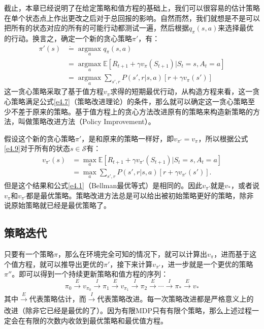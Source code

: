 \documentclass{ctexart}
\begin{document}
            截止，本章已经说明了在给定策略和值方程的基础上，我们可以很容易的估计策略在单个状态点上作出更改之后对于总回报的影响。自然而然，我们就想是不是可以把所有的状态对应的所有的可能行动都测试一遍，然后根据$q_{\pi}(s,a)$来选择最优的行动。换言之，确定一个新的贪心策略$\pi '$，有：
            \begin{equation}
                \begin{split}
                    \pi '(s) &\dot{=} \operatorname*{argmax}\limits_a q_{\pi}(s,a) \\
                             &= \operatorname*{argmax}\limits_{a} \mathbb{E}[R_{t+1} + \gamma v_{\pi}(S_{t+1})|S_t=s,A_t = a] \\
                             &= \operatorname*{argmax}\limits_{a} \sum_{s',r} P(s',r|s,a) [r+\gamma v_{\pi}(s')]
                \end{split}
                \label{e4.9}
            \end{equation}
            这一贪心策略采取了基于值方程$v_{\pi}$求得的短期最优行动，从构造方程来看，这一贪心策略满足公式\ref{e4.7}（策略改进理论）的条件，那么就可以确定这一贪心策略至少不差于原来的策略。基于值方程上的贪心方法改进原有的策略来构造新策略的方法，叫做策略改进方法（Policy Improvement）。

            假设这个新的贪心策略$\pi '$，是和原来的策略一样好，即$v_{\pi '} = v_{\pi}$，所以根据公式\ref{e4.9}对于所有的状态$s\in \mathcal{S}$有：
            \begin{equation}
                \begin{split}
                    v_{\pi '}(s) &= \operatorname*{max}\limits_{a} \mathbb{E}[R_{t+1} + \gamma v_{\pi '}(S_{t+1})|S_t=s,A_t=a] \\
                                 &= \operatorname*{max}\limits_{a} \sum_{s',r}P(s',r|s,a)[r + \gamma v_{\pi '}(s')].
                \end{split}
            \end{equation}
            但是这个结果和公式\ref{e4.1}（Bellman最优等式）是相同的。因此$v_{\pi '}$就是$v_{*}$，或者说$v_{\pi}$和$v_{\pi '}$都是最优策略。策略改进方法总是可以给出被初始策略更好的策略，除非说原始策略就已经是最优策略了。

        \subsection{策略迭代}
            只要有一个策略$\pi$，那么在环境完全可知的情况下，就可以计算出$v_{\pi}$，进而基于这个值方程，就可以推导出更优的$\pi '$，接下来计算$v_{\pi '}$，进一步就是一个更优的策略$\pi ''$。即可以得到一个持续更新策略和值方程的序列：
            \begin{equation}
                \pi_0 \xrightarrow[]{E} v_{\pi_0} \xrightarrow[]{I} \pi_1 \xrightarrow[]{E} v_{\pi_1} \xrightarrow[]{I} \pi_2 \xrightarrow[]{E} \cdots
                \xrightarrow[]{I} \pi_* \xrightarrow[]{E} v_*
            \end{equation}
            其中$\xrightarrow[]{E}$代表策略估计，而$\xrightarrow[]{I}$代表策略改进。每一次策略改进都是严格意义上的改进（除非它已经是最优的了）。因为有限MDP只有有限个策略，那么上述过程一定会在有限的次数内收敛到最优策略和最优值方程。
\end{document}
